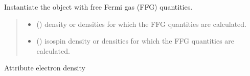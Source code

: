 \documentclass[letterpaper,10pt,english]{sphinxmanual}
\begin{document}
\begin{fulllineitems}
\label{\detokenize{source/api/setup_matter_ffg:nucleardatapy.matter.setup_ffg.setupFFGLep}}
\pysigstartsignatures
{}
\pysigstopsignatures
\sphinxAtStartPar
Instantiate the object with free Fermi gas (FFG) quantities.
\begin{quote}\begin{description}
\begin{itemize}
\item {} 
\sphinxAtStartPar
{} () \textendash{} density or densities for which the FFG quantities are calculated.

\item {} 
\sphinxAtStartPar
{} () \textendash{} isospin density or densities for which the FFG quantities are calculated.

\end{itemize}

\end{description}\end{quote}

\sphinxAtStartPar
{}

\begin{fulllineitems}
\label{\detokenize{source/api/setup_matter_ffg:nucleardatapy.matter.setup_ffg.setupFFGLep.den_e}}
\pysigstartsignatures
{}
\pysigstopsignatures
\sphinxAtStartPar
Attribute electron density

\end{fulllineitems}



\end{fulllineitems}
\end{document}
